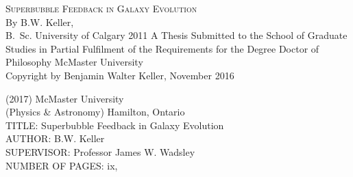 \documentclass[letterpaper,12pt,twoside,openright]{report} %
\begin{document}
\begin{titlepage} %
\thispagestyle{empty}
\centering
\vspace*{\fill} %
{\Large \textsc{Superbubble Feedback in Galaxy Evolution}\\
\vfill
    By {\sc B.W. Keller}, \\
    B.\ Sc. University of Calgary 2011}
\vfill
A Thesis Submitted to the School of Graduate Studies in Partial Fulfilment of
the Requirements for the Degree Doctor of Philosophy
\vfill%
McMaster University \\ \textcopyright{} Copyright by Benjamin Walter Keller, November 2016
\end{titlepage}
{ (2017) \hfill McMaster University \\
(Physics \& Astronomy) \hfill Hamilton, Ontario \\
TITLE: Superbubble Feedback in Galaxy Evolution\\
AUTHOR: B.W. Keller\\
SUPERVISOR: Professor James W. Wadsley\\
NUMBER OF PAGES: ix,~\pageref{LastPage}}
\end{document}
